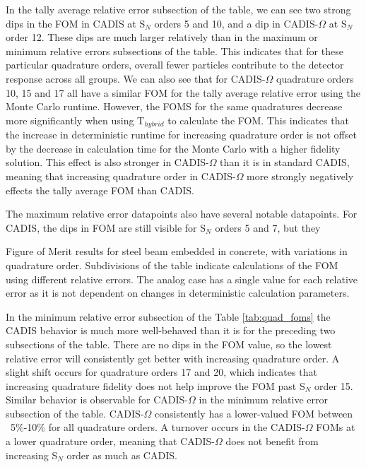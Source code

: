 In the tally average relative error subsection of the table, we can see two strong
dips in the FOM in CADIS at S$_N$ orders 5 and 10, and a dip in CADIS-$\Omega$
at S$_N$ order 12. These dips are much larger relatively than in the maximum or
minimum relative errors subsections of the table. This indicates that for these
particular quadrature orders, overall fewer particles contribute to the
detector response across all groups. We can also see that for CADIS-$\Omega$
quadrature orders 10, 15 and 17 all have a similar FOM for the tally average
relative error using the Monte Carlo runtime. However, the FOMS for the same
quadratures decrease more significantly when using T$_{hybrid}$ to calculate the
FOM. This indicates that the increase in deterministic runtime for increasing
quadrature order is not offset by the decrease in calculation time for the Monte
Carlo with a higher fidelity solution. This effect is also stronger in
CADIS-$\Omega$ than it is in standard CADIS, meaning that increasing quadrature
order in CADIS-$\Omega$ more strongly negatively effects the tally average FOM
than CADIS.

The maximum relative error datapoints also have several notable
datapoints. For CADIS, the dips in FOM are still visible for S$_N$ orders 5 and
7, but they

\begin{table}[h!]
  \centering
  
  \caption[Figure of Merit results for steel beam embedded in concrete, with
  variations in quadrature order.]{Figure of Merit results for steel beam embedded in concrete, with
  variations in quadrature order. Subdivisions of the table indicate
calculations of the FOM using different relative errors. The analog case has a
single value for each relative error as it is not dependent on changes in
deterministic calculation parameters.}
  \label{tab:quad_foms}
\end{table}

In the minimum relative error subsection of the Table \ref{tab:quad_foms}
the CADIS behavior is
much more well-behaved than it is for the preceding two subsections of the
table. There are no dips in the FOM value, so the lowest relative error will
consistently get better with increasing quadrature order. A slight shift
occurs for quadrature orders 17 and 20, which indicates that increasing
quadrature fidelity does not help improve the FOM past S$_N$ order 15. Similar
behavior is observable for CADIS-$\Omega$ in the minimum relative error
subsection of the table. CADIS-$\Omega$ consistently has a lower-valued FOM
between ~5\%-10\% for all quadrature orders. A turnover occurs in the CADIS-$\Omega$
FOMs at a lower quadrature order, meaning that CADIS-$\Omega$ does not benefit
from increasing S$_N$ order as much as CADIS.

